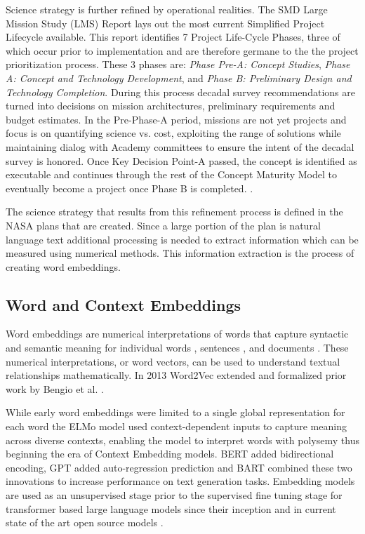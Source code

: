 \documentclass[preprint,12pt]{elsarticle}
\begin{document}
Science strategy is further refined by operational realities. The SMD Large Mission Study (LMS) Report lays out the most current Simplified Project Lifecycle available. This report identifies 7 Project Life-Cycle Phases, three of which occur prior to implementation and are therefore germane to the the project prioritization process. These 3 phases are: \emph{Phase Pre-A: Concept Studies}, \emph{Phase A: Concept and Technology Development}, and \emph{Phase B: Preliminary Design and Technology Completion}. During this process decadal survey recommendations are turned into decisions on mission architectures, preliminary requirements and budget estimates. In the Pre-Phase-A period, missions are not yet projects and focus is on quantifying science vs. cost, exploiting the range of solutions while maintaining dialog with Academy committees to ensure the intent of the decadal survey is honored. Once Key Decision Point-A passed, the concept is identified as executable and continues through the rest of the Concept Maturity Model to eventually become a project once Phase B is completed. \cite{NASA2020_LMS_study} \cite{wessen2013ConceptMaturity}.

The science strategy that results from this refinement process is defined in the NASA plans that are created. Since a large portion of the plan is natural language text additional processing is needed to extract information which can be measured using numerical methods. This information extraction is the process of creating word embeddings.

\subsection{Word and Context Embeddings}
Word embeddings are numerical interpretations of words that capture syntactic and semantic meaning for individual words \cite{mikolov2013_reps_of_words}, sentences \cite{reimers2019sentencebertsentenceembeddingsusing}, and documents \cite{wu_2018_doc_embeds}. These numerical interpretations, or word vectors, can be used to understand textual relationships mathematically. In 2013 Word2Vec extended \cite{mikolov2013_reps_of_words} and formalized \cite{mikolov2013_efficient_word_est} prior work by Bengio et al. \cite{bengio_2003_neural_prob_lang}. 

While early word embeddings were limited to a single global representation for each word the ELMo model \cite{peters2018deepcontextualizedwordrepresentations} used context-dependent inputs to capture meaning across diverse contexts, enabling the model to interpret words with polysemy thus beginning the era of Context Embedding models. BERT \cite{devlin2019bert_pretraining} added bidirectional encoding, GPT \cite{radford2018improving_GPT} added auto-regression prediction and BART \cite{lewis2019bart} combined these two innovations to increase performance on text generation tasks. Embedding models are used as an unsupervised stage prior to the supervised fine tuning stage for transformer based large language models since their inception \cite{vaswani2023attentionneed} and in current state of the art open source models \cite{grattafiori2024_llama3_herdmodels}.
\end{document}
